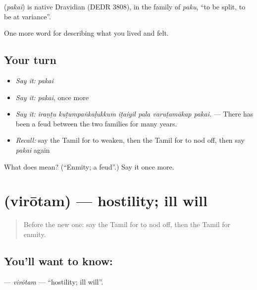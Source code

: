 \begin{cousinweb}
\textbf{} (\emph{pakai}) is native Dravidian (DEDR 3808), in the family of  \emph{paku}, \textquotedblleft{}to be split, to be at variance\textquotedblright{}.
\end{cousinweb}

\begin{grammarlens}[title={What you've built}]
One more word for describing what you lived and felt.
\end{grammarlens}

\subsection*{Your turn}
\begin{itemize}
\raggedright
  \item \emph{Say it:} \emph{pakai}
  \item \emph{Say it:} \emph{pakai}, once more
  \item \emph{Say it:} \emph{iraṇṭu kuṭumpaṅkaḷukkum iṭaiyil pala varuṭamākap pakai.} — There has been a feud between the two families for many years.
  \item \emph{Recall:} say the Tamil for to weaken, then the Tamil for to nod off, then say \emph{pakai} again
\end{itemize}

\begin{tcolorbox}[breakable,colback=teal!4,colframe=teal!35!black,title={Before you move on}]
What does  mean? (\textquotedblleft{}Enmity; a feud\textquotedblright{}.) Say it once more.
\end{tcolorbox}
\section[\texorpdfstring{\ta{விரோதம்} (virōtam)}{விரோதம் (virōtam)}]{ (virōtam) — hostility; ill will}

\label{lesson:TA-C469-virotam}



\begin{quote}
Before the new one: say the Tamil for to nod off, then the Tamil for enmity.
\end{quote}

\subsection*{You'll want to know: }
\textbf{} — \emph{virōtam} — \textquotedblleft{}hostility; ill will\textquotedblright{}.

